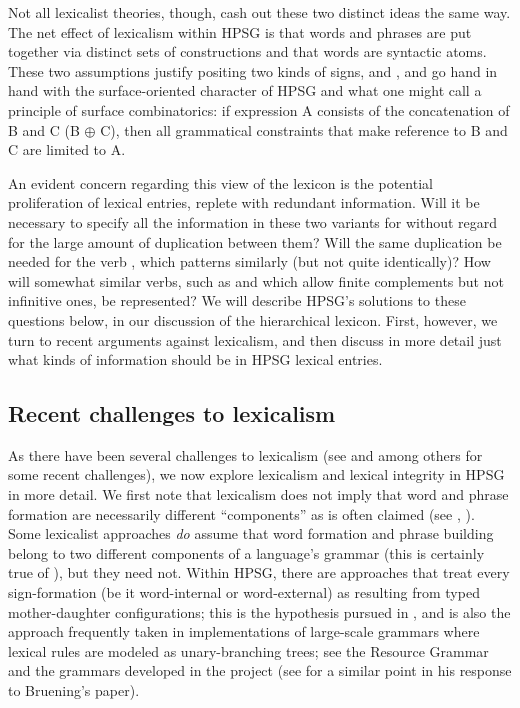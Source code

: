 \documentclass[output=paper
 	        ,biblatex
                ,babelshorthands
                ,newtxmath
                ,draftmode
                ,colorlinks, citecolor=brown
]{langscibook}
\begin{document}
\noindent
Not all lexicalist theories, though, cash out these two
distinct ideas the same way. The net effect of lexicalism within HPSG is that words and phrases are
put together via distinct sets of constructions and that words are syntactic atoms. These two
assumptions justify positing two kinds of signs,  and , and go
hand in hand with the surface-oriented character of HPSG and what one might call a principle of
surface combinatorics: if expression A consists of the concatenation of B and C (B $\oplus$ C), then
all grammatical constraints that make reference to B and C are limited to A.  


An evident concern regarding this view of the lexicon is the potential proliferation of lexical entries, replete with redundant information. Will it be necessary to specify all the information in these two variants for  without regard for the large amount of duplication between them? Will the same duplication be needed for the verb  , which patterns similarly (but not quite identically)? How will somewhat similar verbs, such as  and  which allow finite complements but not infinitive ones, be represented? We will describe HPSG's solutions to these questions below, in our discussion of the hierarchical lexicon. First, however, we turn to recent arguments against lexicalism, and then discuss in more detail just what kinds of information should be in HPSG lexical entries.

\subsection{Recent challenges to lexicalism}

As there have been several challenges to lexicalism (see \citealt{Bruening2018} and  \citealt{Haspelmath2011} among others for some recent challenges), we now explore lexicalism and lexical integrity in HPSG in more detail. We first note that lexicalism does not imply that word and phrase formation are necessarily different ``components'' as is often claimed (see \citealt{Marantz1997}, \citealt{Bruening2018}). Some lexicalist approaches \emph{do} assume that word formation and phrase building belong to two different components of a language's grammar (this is certainly true of \citealt{Jackendoff1975}), but they need not. Within HPSG, there are approaches that treat every sign-formation (be it word-internal or word-external) as resulting from typed mother-daughter configurations; this is the hypothesis pursued in \citealt{Koenig1999c}, and is also the approach frequently taken in implementations of large-scale grammars where lexical rules are modeled as unary-branching trees; see the  Resource Grammar \citep{Copestake2002} and the grammars developed in the  project \citep{Mueller2015}  (see \citealt[58]{MuellerLexicalism} for a similar point in his response to Bruening's paper). 
\end{document}
